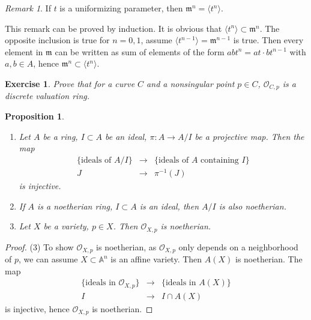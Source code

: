 \documentclass{amsart}
\theoremstyle{plain}
\newtheorem{exercise}{Exercise}
\newtheorem{proposition}{Proposition}
\theoremstyle{definition}
\theoremstyle{remark}
\newtheorem*{remark}{Remark}
\numberwithin{equation}{section}
\begin{document}
 \begin{remark}
 	If $ t $ is a uniformizing parameter, then $ \mathfrak{m}^n=\langle t^n\rangle $.
 \end{remark}
 This remark can be proved by induction. It is obvious that $ \langle t^n\rangle\subset \mathfrak{m}^n $. The opposite inclusion is true for $ n=0,1 $, assume $ \langle t^{n-1}\rangle =\mathfrak{m}^{n-1} $ is true. Then every element in $ \mathfrak{m} $ can be written as sum of elements of the form $ abt^n=at\cdot b t^{n-1} $ with $ a,b\in A $, hence $ \mathfrak{m}^n\subset \langle t^n\rangle $.
 
 \begin{exercise}
 	Prove that for a curve $ C $ and a nonsingular point $ p\in C $, $ \mathcal{O}_{C,p} $ is a discrete valuation ring.
 \end{exercise}
 \begin{proposition}
 	\begin{enumerate}
 		\item Let $ A $ be a ring, $ I\subset A $ be an ideal, $ \pi:A\to A/I $ be a projective map. Then the map 
 		$$
 		\begin{array}{ccc}
 		\lbrace\text{ideals of }A/I \rbrace & \to &\lbrace \text{ideals of }A \text{ containing } I\rbrace\\
 		J &\to & \pi^{-1}(J)
 		\end{array}
 		$$
 		is injective.
 		\item If $ A $ is a noetherian ring, $ I\subset A$ is an ideal, then $ A/I $ is also noetherian.
 		\item Let $ X $ be a variety, $ p\in X $. Then $ \mathcal{O}_{X,p} $ is noetherian.
 	\end{enumerate}
 \end{proposition}
 \begin{proof}
 	(3) To show $ \mathcal{O}_{X,p} $ is noetherian, as $ \mathcal{O}_{X,p} $ only depends on a neighborhood of $ p $, we can assume $ X\subset \mathbb{A}^n $ is an affine variety. Then $ A(X) $ is noetherian. The map 
 	$$
 	\begin{array}{ccc}
 	\lbrace \text{ideals in }\mathcal{O}_{X,p} \rbrace & \to & \lbrace \text{ideals in }A(X) \rbrace\\
 	I & \to & I\cap A(X)
 	\end{array}
 	$$
 	is injective, hence $ \mathcal{O}_{X,p} $ is noetherian.
 \end{proof}
\end{document}
